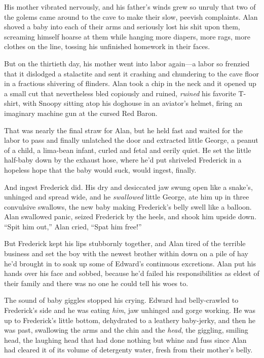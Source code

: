 His mother vibrated nervously, and his father's winds grew so unruly
that two of the golems came around to the cave to make their slow,
peevish complaints.  Alan shoved a baby into each of their arms and
seriously lost his shit upon them, screaming himself hoarse at them
while hanging more diapers, more rags, more clothes on the line,
tossing his unfinished homework in their faces.

But on the thirtieth day, his mother went into labor again---a labor
so frenzied that it dislodged a stalactite and sent it crashing and
chundering to the cave floor in a fractious shivering of flinders. 
Alan took a chip in the neck and it opened up a small cut that
nevertheless bled copiously and ruined, \textit{ruined} his favorite
T-shirt, with Snoopy sitting atop his doghouse in an aviator's helmet,
firing an imaginary machine gun at the cursed Red Baron.

That was nearly the final straw for Alan, but he held fast and waited
for the labor to pass and finally unlatched the door and extracted
little George, a peanut of a child, a lima-bean infant, curled and
fetal and eerily quiet.  He set the little half-baby down by the
exhaust hose, where he'd put shriveled Frederick in a hopeless hope
that the baby would suck, would ingest, finally.

And ingest Frederick did.  His dry and desiccated jaw swung open like
a snake's, unhinged and spread wide, and he \textit{swallowed} little
George, ate him up in three convulsive swallows, the new baby making
Frederick's belly swell like a balloon.  Alan swallowed panic, seized
Frederick by the heels, and shook him upside down.  ``Spit him out,''
Alan cried, ``Spat him free!''

But Frederick kept his lips stubbornly together, and Alan tired of the
terrible business and set the boy with the newest brother within down
on a pile of hay he'd brought in to soak up some of Edward's
continuous excretions.  Alan put his hands over his face and sobbed,
because he'd failed his responsibilities as eldest of their family and
there was no one he could tell his woes to.

The sound of baby giggles stopped his crying.  Edward had
belly-crawled to Frederick's side and he was eating \textit{him}, jaw
unhinged and gorge working.  He was up to Frederick's little bottom,
dehydrated to a leathery baby-jerky, and then he was past, swallowing
the arms and the chin and the \textit{head}, the giggling, smiling
head, the laughing head that had done nothing but whine and fuss since
Alan had cleared it of its volume of detergenty water, fresh from
their mother's belly.

